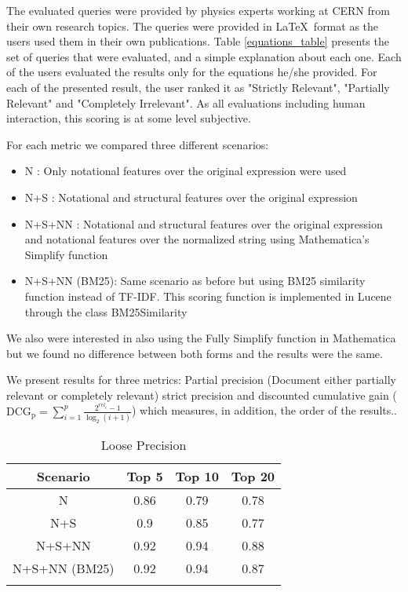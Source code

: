 The evaluated queries were provided by physics experts working at CERN from their own research topics. The queries were provided in \LaTeX\ format as the users used them in their own publications.
Table \ref{equations_table} presents the set of queries that were evaluated, and a simple explanation about each one. 
Each of the users evaluated the results only for the equations he/she provided. For each of the presented result, the user ranked it as "Strictly Relevant", "Partially Relevant" and "Completely Irrelevant". As all evaluations including human interaction, this scoring is at some level subjective. 

For each metric we compared three different scenarios:

\begin{itemize}
\item N : Only notational features over the original expression were used
\item N+S : Notational and structural features over the original expression
\item N+S+NN : Notational and structural features over the original expression and notational features over the normalized string using Mathematica's Simplify function
\item N+S+NN (BM25): Same scenario as before but using BM25 similarity function instead of TF-IDF. This scoring function is implemented in Lucene through the class {\codefont BM25Similarity}
\end{itemize}

We also were interested in also using the Fully Simplify function in Mathematica but we found no difference between both forms and the results were the same.

We present results for three metrics: Partial precision (Document either partially relevant or completely relevant) strict precision and discounted cumulative gain ($ \mathrm{DCG_{p}} = \sum_{i=1}^{p} \frac{ 2^{rel_{i}} - 1 }{ \log_{2}(i+1)} $) which measures, in addition, the order of the results..


\begin{longtable}{|c|c|c|c|}
\hline 
\textbf{Scenario} & \textbf{Top 5} & \textbf{Top 10} & \textbf{Top 20} \\ 
\hline 
N & 0.86 & 0.79 & 0.78 \\ 
\hline 
N+S & 0.9 & 0.85 & 0.77 \\ 
\hline 
N+S+NN & 0.92 & 0.94 & 0.88 \\ 
\hline
N+S+NN (BM25) & 0.92 & 0.94 & 0.87 \\ 
\hline
 
\caption{Loose Precision}
\label{loose_precision}
\end{longtable} 


